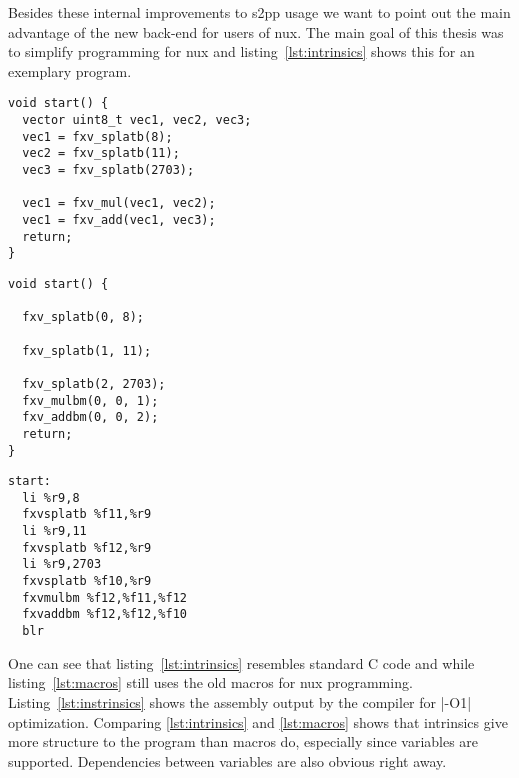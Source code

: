 Besides these internal improvements to \ac{s2pp} usage we want to point out the main advantage of the new back-end for users of nux.
The main goal of this thesis was to simplify programming for nux and listing~\ref{lst:intrinsics} shows this for an exemplary program.
\begin{adjustbox}{center, width=1.1\textwidth}
\lstset{numbers=none}
    \begin{minipage}[t]{.4\textwidth}
    \begin{lstlisting}[caption={Code with Intrinsics}, label=lst:intrinsics]
void start() {
  vector uint8_t vec1, vec2, vec3;
  vec1 = fxv_splatb(8);	
  vec2 = fxv_splatb(11);	
  vec3 = fxv_splatb(2703);	
  
  vec1 = fxv_mul(vec1, vec2);
  vec1 = fxv_add(vec1, vec3);
  return;
} 
\end{lstlisting}
\end{minipage}
\begin{minipage}[t]{.3\textwidth}
\begin{lstlisting}[caption={Code With Macros}, label=lst:macros]
void start() {

  fxv_splatb(0, 8);

  fxv_splatb(1, 11);

  fxv_splatb(2, 2703);
  fxv_mulbm(0, 0, 1);
  fxv_addbm(0, 0, 2);
  return;
} 
\end{lstlisting}
\end{minipage}\begin{minipage}[t]{.4\textwidth}
    \begin{lstlisting}[caption={Assembly Output for \ref{lst:intrinsics}}, label=lst:assembly]
start:
  li %r9,8
  fxvsplatb %f11,%r9
  li %r9,11
  fxvsplatb %f12,%r9
  li %r9,2703	
  fxvsplatb %f10,%r9
  fxvmulbm %f12,%f11,%f12	
  fxvaddbm %f12,%f12,%f10
  blr
\end{lstlisting}
\end{minipage}
\end{adjustbox}

One can see that listing~\ref{lst:intrinsics} resembles standard C code and while listing~\ref{lst:macros} still uses the old macros for nux programming.
Listing~\ref{lst:instrinsics} shows the assembly output by the compiler for |-O1| optimization.
Comparing \ref{lst:intrinsics} and \ref{lst:macros} shows that intrinsics give more structure to the program than macros do, especially since variables are supported.
Dependencies between variables are also obvious right away.

